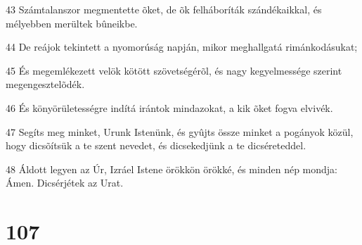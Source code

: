 \par 43 Számtalanszor megmentette õket, de õk felháboríták szándékaikkal, és mélyebben merültek bûneikbe.
\par 44 De reájok tekintett a nyomorúság napján, mikor meghallgatá rimánkodásukat;
\par 45 És megemlékezett velök kötött szövetségérõl, és nagy kegyelmessége szerint megengesztelõdék.
\par 46 És könyörületességre indítá irántok mindazokat, a kik õket fogva elvivék.
\par 47 Segíts meg minket, Urunk Istenünk, és gyûjts össze minket a pogányok közül, hogy dicsõítsük a te szent nevedet, és dicsekedjünk a te dicséreteddel.
\par 48 Áldott legyen az Úr, Izráel Istene örökkön örökké, és minden nép mondja: Ámen. Dicsérjétek az Urat.

\chapter{107}

